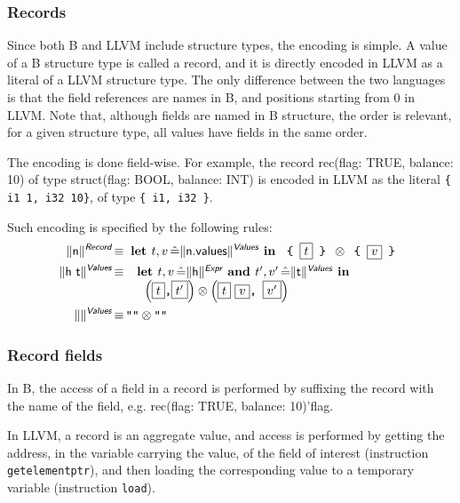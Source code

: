 \documentclass{llncs}
\newcommand{\trad}[2]{\ensuremath{\lVert \textsf{#1} \rVert^{\textit{#2}}}}
\DeclareMathOperator{\isdef}{\equiv}
\newcommand{\llvm}[1]{\texttt{#1}}
\newcommand{\B}[1]{\textsf{#1}}
\newcommand{\LET}[0]{\textbf{ let }}
\DeclareMathOperator{\BE}{\hat{=}}
\newcommand{\IN}[0]{\textbf{ in }}
\newcommand{\AND}[0]{\textbf{ and }}
\newcommand{\PH}[1]{\framebox{$#1$}}
\newcommand{\sep}[0]{\otimes}
\begin{document}
\subsubsection{Records}

Since both B and LLVM include structure types, the encoding is simple.
A value of a B structure type is called a record, and it is directly
encoded in LLVM as a literal of a LLVM structure type. The only
difference between the two languages is that the field references are
names in B, and positions starting from 0 in LLVM. Note that, although
fields are named in B structure, the order is relevant, for a given structure
type, all values have fields in the same order.

The encoding is done field-wise. For example, the record \B{rec(flag:
  TRUE, balance: 10)} of type \B{struct(flag: BOOL, balance: INT)} is
encoded in LLVM as the literal \llvm{\{ i1 1, i32 10\}}, of type
\llvm{\{ i1, i32 \}}.

Such encoding is specified by the following rules:
\begin{align*}
\trad{n}{\B{Record}} & \isdef \LET t, v \BE \trad{n.values}{\B{Values}} \IN
\llvm{ \{ } \PH{t} \llvm{ \} } \sep \llvm{ \{ } \PH{ v } \llvm{ \} } \\
\trad{h t}{\B{Values}} & \isdef \begin{array}[t]{l}
  \LET t, v \BE \trad{h}{\B{Expr}} \AND t', v' \BE \trad{t}{\B{Values}} \IN \\
  \quad \left(\PH{t} \llvm{,} \PH{t'}\right) \sep \left(\PH{t}~\PH{v} \llvm{, } \PH{v'}\right) 
\end{array} \\
\trad{}{\B{Values}} & \isdef \llvm{""} \sep \llvm{""}
\end{align*}

\subsubsection{Record fields}

In B, the access of a field in a record is performed by suffixing the
record with the name of the field, e.g. \B{rec(flag: TRUE, balance:  10)'flag}.

In LLVM, a record is an aggregate value, and access is performed by
getting the address, in the variable carrying the value, of the field
of interest (instruction \llvm{getelementptr}), and then loading the
corresponding value to a temporary variable (instruction \llvm{load}).
\end{document}
